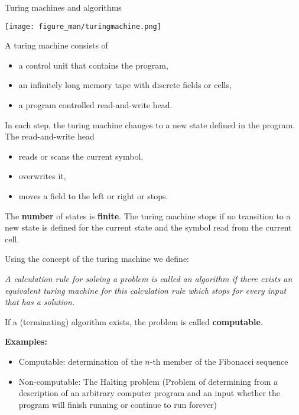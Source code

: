 \documentclass[11pt,compress,t,notes=noshow, xcolor=table]{beamer}
\begin{document}
\begin{vbframe}{Turing machines and algorithms}

\begin{center}
\texttt{[image: figure\_man/turingmachine.png]}
\end{center}

A turing machine consists of

\begin{itemize}
\item a control unit that contains the program,
\item an infinitely long memory tape with discrete fields or cells,
\item a program controlled read-and-write head.
\end{itemize}


\framebreak

In each step, the turing machine changes to a new state defined in the program. The read-and-write head

\begin{itemize}
\item reads or scans the current symbol,
\item overwrites it,
\item moves a field to the left or right or stops.
\end{itemize}

The \textbf{number} of states is \textbf{finite}. The turing machine stops if no transition to a new state is defined for the current state and the symbol read from the current cell.


\framebreak

Using the concept of the turing machine we define:

\begin{center}
\begin{minipage}{0.9\textwidth}
\emph{A calculation rule for solving a problem is called an algorithm if there exists an equivalent turing machine for this calculation rule which stops for every input that has a solution.} \\
\end{minipage}
\end{center}

If a (terminating) algorithm exists, the problem is called \textbf{computable}.

\lz

\textbf{Examples: }

\begin{itemize}
\item Computable: determination of the $n$-th member of the Fibonacci sequence
\item Non-computable: The Halting problem (Problem of determining from a description of an arbitrary computer program and an input whether the program will finish running or continue to run forever)
\end{itemize}


\end{vbframe}
\end{document}
